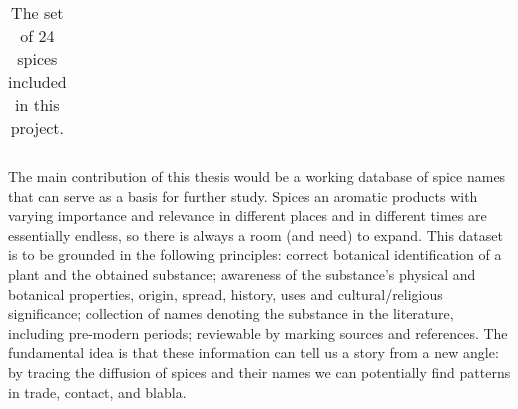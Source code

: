 \begin{table}[ht]
\begin{tabularx}{\textwidth}{@{}r>{\footnotesize}llll@{}rl@{}}
\bottomrule
\end{tabularx}
\caption[The set of 24 spices included in this project.]{The set of 24 spices included in this project.}
\end{table}

\setlength{\tabcolsep}{6pt}





The main contribution of this thesis would be a working database of spice names that can serve as a basis for further study. Spices an aromatic products with varying importance and relevance in different places and in different times are essentially endless, so there is always a room (and need) to expand. This dataset is to be grounded in the following principles: correct botanical identification of a plant and the obtained substance; awareness of the substance's physical and botanical properties, origin, spread, history, uses and cultural/religious significance; collection of names denoting the substance in the literature, including pre-modern periods; reviewable by marking sources and references. The fundamental idea is that these information can tell us a story from a new angle: by tracing the diffusion of spices and their names we can potentially find patterns in trade, contact, and blabla. 

